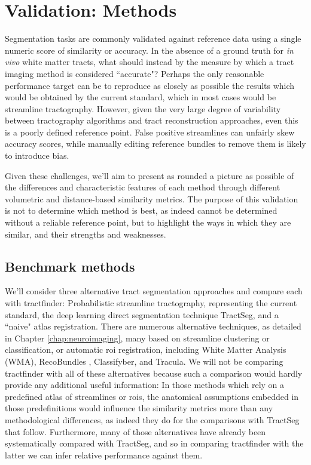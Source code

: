 
\section{Validation: Methods}

Segmentation tasks are commonly validated against reference data using a single numeric score of similarity or accuracy.
In the absence of a ground truth for \textit{in vivo} white matter tracts, what should instead by the measure by which a tract imaging method is considered ``accurate"?
Perhaps the only reasonable performance target can be to reproduce as closely as possible the results which would be obtained by the current standard, which in most cases would be streamline tractography.
However, given the very large degree of variability between tractography algorithms and tract reconstruction approaches, even this is a poorly defined reference point.
False positive streamlines can unfairly skew accuracy scores, while manually editing reference bundles to remove them is likely to introduce bias.

Given these challenges, we'll aim to present as rounded a picture as possible of the differences and characteristic features of each method through different volumetric and distance-based similarity metrics.
The purpose of this validation is not to determine which method is best, as indeed cannot be determined without a reliable reference point, but to highlight the ways in which they are similar, and their strengths and weaknesses.

\subsection{Benchmark methods}
\label{sec:methods}

We'll consider three alternative tract segmentation approaches and compare each with tractfinder: Probabilistic streamline tractography, representing the current standard, the deep learning direct segmentation technique TractSeg, and a ``naive" atlas registration.
There are numerous alternative techniques, as detailed in Chapter \ref{chap:neuroimaging}, many based on streamline clustering or classification, or automatic \gls{roi} registration, including White Matter Analysis (WMA)\autocite{ODonnell2017}, RecoBundles \autocite{Garyfallidis2018}, Classifyber\autocite{Berto2021}, and Tracula\autocite{Yendiki2011}.
We will not be comparing tractfinder with all of these alternatives because such a comparison would hardly provide any additional useful information:
In those methods which rely on a predefined atlas of streamlines or \glspl{roi}, the anatomical assumptions embedded in those predefinitions would influence the similarity metrics more than any methodological differences, as indeed they do for the comparisons with TractSeg that follow.
Furthermore, many of those alternatives have already been systematically compared with TractSeg\autocite{Wasserthal2018,Berto2021}, and so in comparing tractfinder with the latter we can infer relative performance against them.

